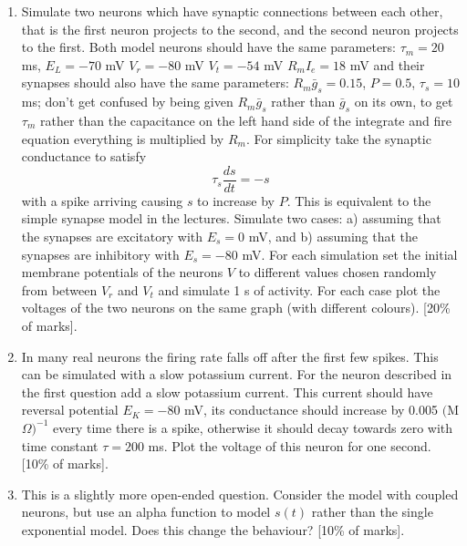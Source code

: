 \documentclass[11pt,a4paper]{scrartcl}
\begin{document}
\begin{enumerate}
\item Simulate two neurons which have synaptic connections between
  each other, that is the first neuron projects to the second, and the
  second neuron projects to the first. Both model neurons should have
  the same parameters: $\tau_m = 20$ ms, $E_L = -70$ mV $V_r = -80$ mV
  $V_t = -54$ mV $R_mI_e = 18$ mV and their synapses should also have
  the same parameters: $R_m \bar{g}_s = 0.15$, $P = 0.5$, $\tau_s= 10$
  ms; don't get confused by being given $R_m\bar{g}_s$ rather than
  $\bar{g}_s$ on its own, to get $\tau_m$ rather than the capacitance
  on the left hand side of the integrate and fire equation everything
  is multiplied by $R_m$. For simplicity take the synaptic conductance
  to satisfy
\begin{equation}
\tau_s\frac{ds}{dt}=-s
\end{equation}
with a spike arriving causing $s$ to increase by $P$. This is
equivalent to the simple synapse model in the lectures. Simulate two
cases: a) assuming that the synapses are excitatory with $E_s = 0$ mV,
and b) assuming that the synapses are inhibitory with $E_s = -80$
mV. For each simulation set the initial membrane potentials of the
neurons $V$ to different values chosen randomly from between $V_r$ and
$V_t$ and simulate 1 s of activity. For each case plot the voltages of
the two neurons on the same graph (with different colours). [20\% of
  marks].

\item In many real neurons the firing rate falls off after the first
  few spikes. This can be simulated with a slow potassium current. For
  the neuron described in the first question add a slow potassium
  current. This current should have reversal potential $E_K=-80$ mV,
  its conductance should increase by 0.005 $($M$\Omega)^{-1}$ every
  time there is a spike, otherwise it should decay towards zero with
  time constant $\tau=200$ ms. Plot the voltage of this neuron for one
  second. [10\% of marks].

\item This is a slightly more open-ended question. Consider the model
  with coupled neurons, but use an alpha function to model $s(t)$
  rather than the single exponential model. Does this change the
  behaviour? [10\% of marks].

\end{enumerate}
\end{document}
